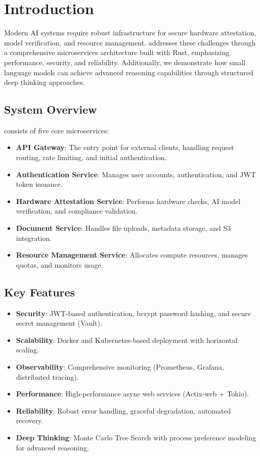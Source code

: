 \section{Introduction}

Modern AI systems require robust infrastructure for secure hardware attestation, model verification, and resource management. \sysname{} addresses these challenges through a comprehensive microservices architecture built with Rust, emphasizing performance, security, and reliability. Additionally, we demonstrate how small language models can achieve advanced reasoning capabilities through structured deep thinking approaches.

\subsection{System Overview}

\sysname{} consists of five core microservices:
\begin{itemize}
    \item \textbf{API Gateway}: The entry point for external clients, handling request routing, rate limiting, and initial authentication.
    \item \textbf{Authentication Service}: Manages user accounts, authentication, and JWT token issuance.
    \item \textbf{Hardware Attestation Service}: Performs hardware checks, AI model verification, and compliance validation.
    \item \textbf{Document Service}: Handles file uploads, metadata storage, and S3 integration.
    \item \textbf{Resource Management Service}: Allocates compute resources, manages quotas, and monitors usage.
\end{itemize}

\subsection{Key Features}

\begin{itemize}
    \item \textbf{Security}: JWT-based authentication, bcrypt password hashing, and secure secret management (Vault).
    \item \textbf{Scalability}: Docker and Kubernetes-based deployment with horizontal scaling.
    \item \textbf{Observability}: Comprehensive monitoring (Prometheus, Grafana, distributed tracing).
    \item \textbf{Performance}: High-performance async web services (Actix-web + Tokio).
    \item \textbf{Reliability}: Robust error handling, graceful degradation, automated recovery.
    \item \textbf{Deep Thinking}: Monte Carlo Tree Search with process preference modeling for advanced reasoning.
\end{itemize}

